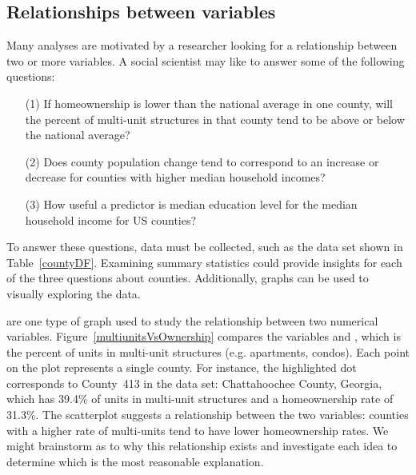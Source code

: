\subsection{Relationships between variables}
\label{variableRelations}

Many analyses are motivated by a researcher looking
for a relationship between two or more variables.
A social scientist may like to answer some of the
following questions:
\begin{enumerate}
\setlength{\itemsep}{0mm}
\item[(1)]\label{ownershipMultiUnitQuestion}
    If homeownership is lower than the national average
    in one county, will the percent of multi-unit structures
    in that county tend to be above or below the national average?
\item[(2)]\label{pop_change_v_median_hh_income_question}
    Does county population change tend to correspond to an increase
    or decrease for counties with higher median household incomes?
\item[(3)]\label{isAverageIncomeAssociatedWithSmokingBans}
    How useful a predictor is median education level
    for the median household income for US counties?
\end{enumerate}

To answer these questions, data must be collected, such
as the  data set shown in Table~\ref{countyDF}.
Examining summary statistics  could
provide insights for each of the three questions about counties.
Additionally, graphs can be used to visually exploring the data.

 are one type of graph
used to study the relationship between two numerical variables.
Figure~\ref{multiunitsVsOwnership} compares the variables
 and
,
which is the percent of units in multi-unit structures
(e.g. apartments, condos).
Each point on the plot represents a single county.
For instance, the highlighted dot corresponds to
County~413 in the  data set:
Chattahoochee County, Georgia, which has 39.4\% of
units in multi-unit structures and a homeownership rate
of 31.3\%.
The scatterplot suggests a relationship between the
two variables: counties with a higher rate of multi-units
tend to have lower homeownership rates.
We might brainstorm as to why this relationship exists
and investigate each idea to determine which is the most
reasonable explanation.

